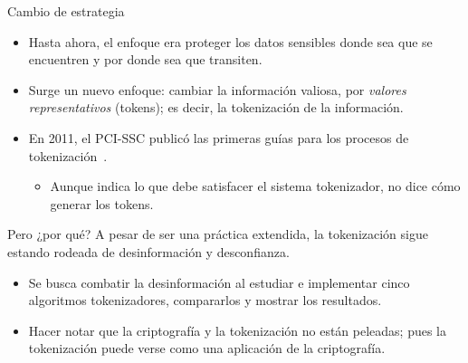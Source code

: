 \begin{frame}{Cambio de estrategia}
  \begin{itemize}
    \item Hasta ahora, el enfoque era proteger los datos sensibles donde sea
      que se encuentren y por donde sea que transiten.
    \item Surge un nuevo enfoque: cambiar la información valiosa, por
      \textit{valores representativos} (tokens); es decir, la tokenización
      de la información.
    \item En 2011, el PCI-SSC\footnotemark{} publicó las primeras guías para los
      procesos de tokenización~\cite{pci_tokens}.
      \begin{itemize}
        \item Aunque indica lo que debe satisfacer el sistema tokenizador,
          no dice cómo generar los tokens.
      \end{itemize}
  \end{itemize}
\end{frame}

\begin{frame}{Pero ¿por qué?}
  A pesar de ser una práctica extendida, la tokenización sigue estando
  rodeada de desinformación y desconfianza.
  \begin{itemize}
    \item Se busca combatir la desinformación al estudiar e implementar cinco
      algoritmos tokenizadores, compararlos y mostrar los resultados.
    \item Hacer notar que la criptografía y la tokenización no están peleadas;
      pues la tokenización puede verse como una aplicación de la criptografía.
  \end{itemize}
\end{frame}
